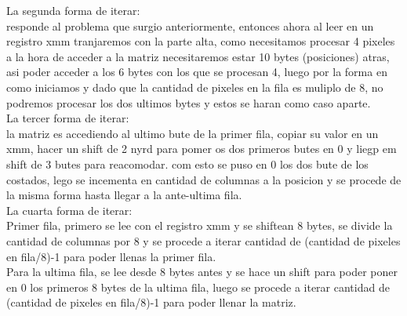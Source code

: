 La segunda forma de iterar:\\ responde al problema que surgio anteriormente, entonces ahora al leer en un registro xmm tranjaremos con la parte alta, como necesitamos procesar 4 pixeles a la hora de acceder a la matriz necesitaremos estar 10 bytes (posiciones) atras, asi poder acceder a los 6 bytes con los que se procesan 4, luego por la forma en como iniciamos y dado que la cantidad de pixeles en la fila es muliplo de 8, no podremos  procesar los dos ultimos bytes y estos se haran como caso aparte.\\

La tercer forma de iterar:\\ la matriz es accediendo al ultimo bute de la primer fila, copiar su valor en un xmm, hacer un shift de 2 nyrd para pomer os dos primeros butes en 0 y liegp em shift de 3 butes para reacomodar. com esto se puso en 0 los dos bute de los costados, lego se incementa en cantidad de columnas a la posicion y se procede de la misma forma hasta llegar a la ante-ultima fila.\\

La cuarta forma de iterar:\\
	Primer fila, primero se lee con el registro xmm y se shiftean 8 bytes, se divide la cantidad de columnas por 8 y se procede a iterar cantidad de (cantidad de pixeles en fila/8)-1 para poder llenas la primer fila.\\
	Para la ultima fila, se lee desde 8 bytes antes y se hace un shift para poder poner en 0 los primeros 8 bytes de la ultima fila, luego se procede a iterar cantidad de (cantidad de pixeles en fila/8)-1 para poder llenar la matriz.\\


